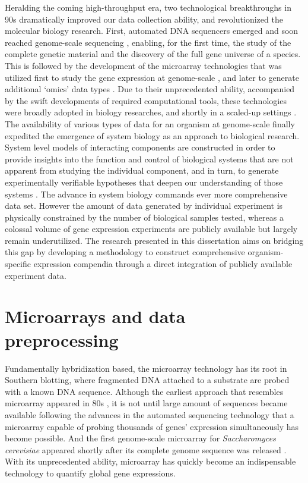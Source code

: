 Heralding the coming high-throughput era, two technological breakthroughs in 90s dramatically improved our data collection ability, and revolutionized the molecular biology research. First, automated DNA sequencers emerged and soon reached genome-scale sequencing \cite{Fleischmann1995}, enabling, for the first time, the study of the complete genetic material and the discovery of the full gene universe of a species. This is followed by the development of the microarray technologies \cite{Pease1994, Schena1995} that was utilized first to study the gene expression at genome-scale \cite{Davis1997}, and later to generate additional `omics' data types \cite{Blat1999, Uetz2000}. Due to their unprecedented ability, accompanied by the swift developments of required computational tools, these technologies were broadly adopted in biology researches, and shortly in a scaled-up settings \cite{Su2002,Su2004}. The availability of various types of data for an organism at genome-scale finally expedited the emergence of system biology as an approach to biological research.  System level models of interacting components are constructed in order to provide insights into the function and control of biological systems that are not apparent from studying the individual component, and in turn, to generate experimentally verifiable hypotheses that deepen our understanding of those systems \cite{Ideker2001, Palsson2002}. The advance in system biology commands ever more comprehensive data set. However the amount of data generated by individual experiment is physically constrained by the number of biological samples tested, whereas a colossal volume of gene expression experiments are publicly available but largely remain underutilized. The research presented in this dissertation aims on bridging this gap by developing a methodology to construct comprehensive organism-specific expression compendia through a direct integration of publicly available experiment data.



\section{Microarrays and data preprocessing}

Fundamentally hybridization based, the microarray technology has its root in Southern blotting, where fragmented DNA attached to a substrate are probed with a known DNA sequence. Although the earliest approach that resembles microarray appeared in 80s \cite{Augenlicht1982}, it is not until large amount of sequences became available following the advances in the automated sequencing technology that a microarray capable of probing thousands of genes' expression simultaneously has become possible. And the first genome-scale microarray for \textit{Saccharomyces   cerevisiae} \cite{Davis1997} appeared shortly after its complete genome sequence was released \cite{Goffeau1996}. With its unprecedented ability, microarray has quickly become an indispensable technology to quantify global gene expressions.



